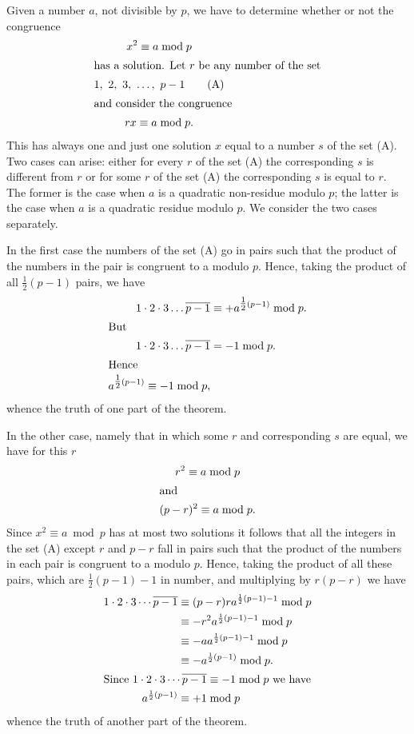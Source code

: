 \documentclass[oneside]{book}
\begin{document}
Given a number $a$, not divisible by $p$, we have to determine
whether or not the congruence
\begin{gather}
x^2 \equiv a \bmod p \notag \\
\intertext{has a solution. Let $r$ be any number of the set}
1,\ 2,\ 3,\ \ldots,\ p-1 \tag{A} \\
\intertext{and consider the congruence}
rx \equiv a \bmod p.
\end{gather}
This has always one and just one solution $x$ equal to a number $s$
of the set (A). Two cases can arise: either for every $r$ of the set
(A) the corresponding $s$ is different from $r$ or for some $r$ of
the set (A) the corresponding $s$ is equal to $r$. The former is the
case when $a$ is a quadratic non-residue modulo $p$; the latter is
the case when $a$ is a quadratic residue modulo $p$. We consider the
two cases separately.

In the first case the numbers of the set (A) go in pairs such that
the product of the numbers in the pair is congruent to a modulo $p$.
Hence, taking the product of all $\tfrac{1}{2}(p - 1)$ pairs, we
have
\begin{align*}
1 \cdot 2 \cdot 3 \ldots \overline{p-1} &\equiv
      +a^{\tfrac{1}{2}(p-1)} \bmod p. \\
\intertext{But}
1 \cdot 2 \cdot 3 \ldots \overline{p-1} &= -1 \bmod p. \\
\intertext{Hence}
a^{\tfrac{1}{2}(p-1)} \equiv -1 \bmod p,
\end{align*}
whence the truth of one part of the theorem.

In the other case, namely that in which some $r$ and corresponding
$s$ are equal, we have for this $r$
\begin{gather*}
r^{2} \equiv a \bmod p \\
\intertext{and}
(p - r)^{2} \equiv a \bmod p.
\end{gather*}
Since $x^{2} \equiv a \bmod p$ has at most two solutions it follows
that all the integers in the set (A) except $r$ and $p - r$ fall in
pairs such that the product of the numbers in each pair is congruent
to a modulo $p$. Hence, taking the product of all these pairs, which
are $\frac{1}{2}(p - 1) - 1$ in number, and multiplying by $r(p-r)$
we have
\begin{align*}
1 \cdot 2 \cdot 3 \cdots \overline{p -1}
   &\equiv (p - r) r a^{\frac{1}{2}(p -1) - 1} \bmod p  \\
   &\equiv -r^{2} a^{\frac{1}{2}(p -1) - 1}    \bmod p  \\
   &\equiv -a a^{\frac{1}{2}(p -1) - 1}        \bmod p  \\
   &\equiv -a^{\frac{1}{2}(p -1)}              \bmod p. \\
\intertext{Since $1 \cdot 2 \cdot 3 \cdots \overline{p - 1} \equiv -1
\bmod p$ we have}
a^{\frac{1}{2}(p -1)} &\equiv + 1 \bmod p
\end{align*}
whence the truth of another part of the theorem.
\end{document}
